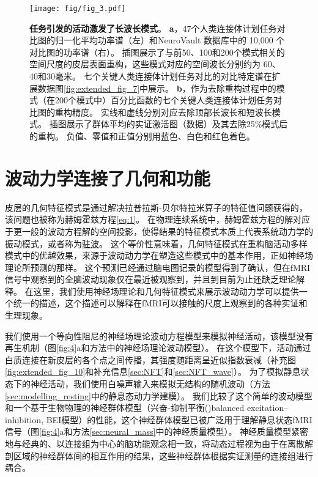 \documentclass[lang=cn,a4paper,newtx]{elegantpaper}
\begin{document}
\begin{figure}[!htb]
	\centering
	\texttt{[image: fig/fig\_3.pdf]}
	\caption{\textbf{任务引发的活动激发了长波长模式}。
	\textbf{a}，47个人类连接体计划任务对比图的归一化平均功率谱（左）和NeuroVault 数据库中的 10,000 个对比图的功率谱（右）。
	插图展示了与前50、100和200个模式相关的空间尺度的皮层表面重构，这些模式对应的空间波长分别约为 60、40和30毫米。
	七个关键人类连接体计划任务对比的对比特定谱在扩展数据图\ref{fig:extended_fig_7}中展示。 
	\textbf{b}，作为去除重构过程中的模式（在200个模式中）百分比函数的七个关键人类连接体计划任务对比图的重构精度。
	实线和虚线分别对应去除顶部长波长和短波长模式。
	插图展示了群体平均的实证激活图（数据）及其去除25\%模式后的重构。
	负值、零值和正值分别用蓝色、白色和红色着色。
	} \label{fig:3}
\end{figure}


\section{波动力学连接了几何和功能}

皮层的几何特征模式是通过解决拉普拉斯-贝尔特拉米算子的特征值问题获得的，该问题也被称为赫姆霍兹方程\ref{eq:1}。
在物理连续系统中，赫姆霍兹方程的解对应于更一般的波动方程解的空间投影，使得结果的特征模式本质上代表系统动力学的振动模式，或者称为\href{https://baike.baidu.com/item/%E9%A9%BB%E6%B3%A2}{驻波}。
这个等价性意味着，几何特征模式在重构脑活动多样模式中的优越效果，来源于波动动力学在塑造这些模式中的基本作用，正如神经场理论所预测的那样。
这个预测已经通过脑电图记录的模型得到了确认，但在fMRI信号中观察到的全脑波动现象仅在最近被观察到，并且到目前为止还缺乏理论解释。
在这里，我们使用神经场理论和几何特征模式来展示波动动力学可以提供一个统一的描述，这个描述可以解释在fMRI可以接触的尺度上观察到的各种实证和生理现象。


我们使用一个等向性阻尼的神经场理论波动方程模型来模拟神经活动，该模型没有再生机制（图\ref{fig:4}a和方法中的神经场理论波动模型）。
在这个模型下，活动通过白质连接在新皮层的各个点之间传播，其强度随距离呈近似指数衰减（补充图\ref{fig:extended_fig_10}和补充信息\ref{sec:NFT}和\ref{sec:NFT_wave}）。
为了模拟静息状态下的神经活动，我们使用白噪声输入来模拟无结构的随机波动（方法\ref{sec:modelling_resting}中的静息态动力学建模）。
我们比较了这个简单的波动模型和一个基于生物物理的神经群体模型（兴奋-抑制平衡()balanced excitation–inhibition, BEI模型）的性能，这个神经群体模型已被广泛用于理解静息状态fMRI信号（图\ref{fig:4}a和方法\ref{sec:neural_mass}中的神经质量模型）。
神经质量模型紧密地与经典的、以连接组为中心的脑功能观念相一致，将动态过程视为由于在离散解剖区域的神经群体间的相互作用的结果，这些神经群体根据实证测量的连接组进行耦合。
\end{document}
